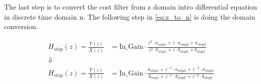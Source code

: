 The last step is to convert the cost filter from z domain intro differential equation in discrete time domain n. The following step in \autoref{eq:z_to_n} is doing the domain conversion.



\begin{subequations}\label{eq:bandstop_filter_peak_n}
\begin{alignat}{2}
 H_{stop}(z)=\frac{Y(z)}{X(z)} &=  \text{In_Gain} \cdot \frac{z^2 \cdot a_{stop1} + z \cdot a_{stop2} + a_{stop3}}{z^2 \cdot b_{stop1} + z \cdot b_{stop2} + b_{stop3}} \label{eq:bandstop_filter_peak_n_1}\\
 \Downarrow\\
 H_{stop}(z)=\frac{Y(z)}{X(z)} &=  \text{In_Gain} \cdot \frac{a_{stop1} + z^{-1} \cdot a_{stop2} +  z^{-2} \cdot a_{stop3}}{b_{stop1} + z^{-1} \cdot b_{stop2} +  z^{-2} \cdot b_{stop3}}  \label{eq:bandstop_filter_peak_n_2}
\end{alignat}
\end{subequations}


